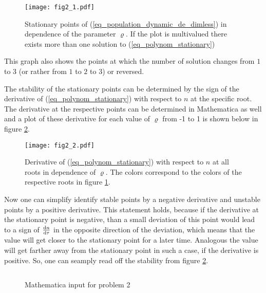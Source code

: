 \documentclass[12pt, a4paper]{article}
\begin{document}
  \begin{figure}
    \centering
    \texttt{[image: fig2\_1.pdf]}
    \caption{Stationary points of (\ref{eq_population_dynamic_de_dimless}) in dependence of the parameter $\varrho$. If the plot is multivalued there exists more than one solution to (\ref{eq_polynom_stationary})}
    \label{fig_stationary_points}
  \end{figure}

  This graph also shows the points at which the number of solution changes from $1$ to $3$ (or rather from $1$ to $2$ to $3$) or reversed.

  The stability of the stationary points can be determined by the sign of the derivative of (\ref{eq_polynom_stationary}) with respect to $n$ at the specific root. The derivative at the respective points can be determined in Mathematica as well and a plot of these derivative for each value of $\varrho$ from -1 to 1 is shown below in figure \ref{fig_stationary_points_stability}.

  \begin{figure}
    \centering
    \texttt{[image: fig2\_2.pdf]}
    \caption{Derivative of (\ref{eq_polynom_stationary}) with respect to $n$ at all roots in dependence of $\varrho$. The colors correspond to the colors of the respective roots in figure \ref{fig_stationary_points}.}
    \label{fig_stationary_points_stability}
  \end{figure}

  Now one can simplify identify stable points by a negative derivative and unstable points by a positive derivative. This statement holds, because if the derivative at the stationary point is negative, than a small deviation of this point would lead to a sign of $\frac{{\rm d} n}{{\rm d} \tau}$ \glqq in the opposite direction\grqq{} of the deviation, which means that the value will get closer to the stationary point for a later time. Analogous the value will get farther away from the stationary point in such a case, if the derivative is positive. So, one can seamply read off the stability from figure \ref{fig_stationary_points_stability}.

  \begin{figure}
    \captionsetup{type=listing}
    \inputminted{mathematica}{problem2_code.txt}
    \caption{Mathematica input for problem 2}
  \end{figure}
  
\end{document}
